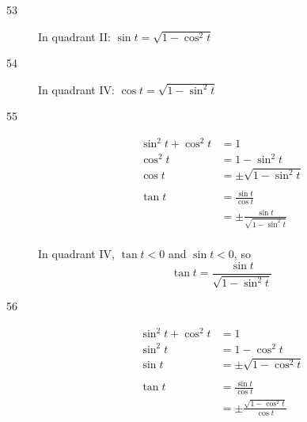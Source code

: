 \documentclass{exam}
\begin{document}
\begin{description}
      \item[53] In quadrant II: $\sin t = \boxed{ \sqrt{1 - \cos^2 t} }$

      \item[54] In quadrant IV: $\cos t = \boxed{ \sqrt{1 - \sin^2 t} }$

      \item[55] 
        \begin{align*}
          \sin^2 t + \cos^2 t & = 1 \\
          \cos^2 t            & = 1 - \sin^2 t \\
          \cos t              & = \pm \sqrt{1 - \sin^2 t} \\
          \\
          \tan t              & = \frac{\sin t}{\cos t} \\
                              & = \pm \frac{\sin t}{\sqrt{1 - \sin^2 t}} \\
        \end{align*}


        In quadrant IV, $\tan t < 0$ and $\sin t < 0$, so 
        \[
          \tan t = \boxed{ \frac{\sin t}{ \sqrt{1 - \sin^2 t} } } 
        \]

      \item[56] 
        \begin{align*}
          \sin^2 t + \cos^2 t & = 1 \\
          \sin^2 t            & = 1 - \cos^2 t \\
          \sin t              & = \pm \sqrt{1 - \cos^2 t} \\
          \\
          \tan t              & = \frac{\sin t}{\cos t} \\
                              & = \pm \frac{\sqrt{1 - \cos^2 t}}{\cos t} \\
        \end{align*}


\end{description}
\end{document}
